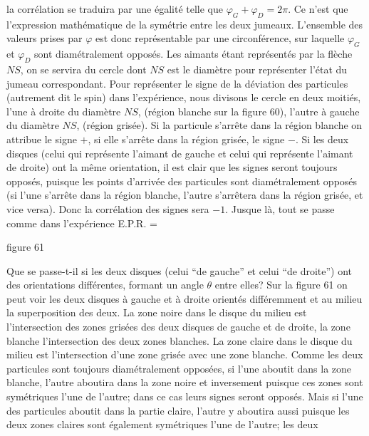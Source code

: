 la corr\'elation se traduira par une \'egalit\'e telle que $\varphi_G +
\varphi_D = 2\pi$.  Ce n'est que l'expression math\'ematique de la 
sym\'etrie entre les deux jumeaux.
\medskip 
L'ensemble des valeurs prises par $\varphi$ est donc repr\'esentable  
par une circonf\'erence, sur laquelle $\varphi_G$ et $\varphi_D$ sont 
diam\'etralement oppos\'es.  Les aimants \'etant repr\'esent\'es par la 
fl\`eche $NS$, on se servira du cercle dont $NS$ est le diam\`etre pour  
repr\'esenter l'\'etat du jumeau correspondant. 
\medskip  
Pour repr\'esenter le signe de la d\'eviation des particules (autrement dit 
le spin) dans  l'exp\'erience, nous divisons le cercle en deux  moiti\'es,
l'une \`a droite du diam\`etre $NS$, (r\'egion blanche sur la figure 60),
l'autre \`a gauche du diam\`etre $NS$, (r\'egion gris\'ee).  Si la particule
s'arr\^ete  dans la r\'egion blanche on attribue le signe $+$,  si elle
s'arr\^ete dans  la  r\'egion gris\'ee, le signe $-$. Si les deux 
disques (celui qui repr\'esente l'aimant de gauche et celui qui repr\'esente  
l'aimant de droite) ont la m\^eme orientation, il est clair que les signes 
seront toujours oppos\'es, puisque les points d'arriv\'ee des  particules 
sont diam\'etralement  oppos\'es  (si  l'une s'arr\^ete dans la  r\'egion 
blanche, l'autre s'arr\^etera  dans la r\'egion gris\'ee, et vice versa).  
Donc la corr\'elation des signes sera $-1$. Jusque l\`a, tout se passe 
comme dans l'exp\'erience  E.P.R.  
\medskip 
\midinsert 
\epsfxsize=\hsize
{} 
\vskip3mm
\centerline{\eightpoint figure 61} 
\endinsert 
Que se passe-t-il si les deux disques (celui ``de gauche'' et celui ``de 
droite'') ont des orientations diff\'erentes, formant un angle $\theta$ 
entre elles? Sur la figure 61 on peut voir les deux disques \`a gauche et 
\`a droite orient\'es diff\'eremment et au milieu la superposition des 
deux. La zone noire dans le disque du milieu est l'intersection des zones 
gris\'ees des deux disques de gauche et de droite, la zone blanche 
l'intersection des deux zones blanches. La zone claire dans le disque  
du milieu est l'intersection d'une zone gris\'ee  avec une zone blanche. 
Comme les deux particules sont  toujours diam\'etralement oppos\'ees,  
si l'une aboutit dans la zone  blanche, l'autre aboutira dans la zone noire 
et inversement puisque ces zones sont sym\'etriques l'une de l'autre;  
dans ce cas leurs signes seront oppos\'es. Mais si l'une des particules 
aboutit dans  la partie claire, l'autre y aboutira aussi puisque les deux 
zones claires sont \'egalement sym\'etriques l'une de l'autre; les deux 

